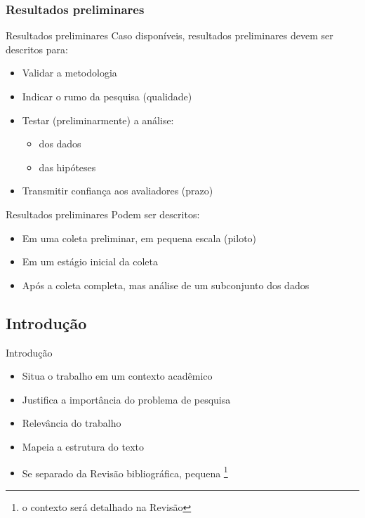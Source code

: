 \documentclass{beamer}
\begin{document}
\subsubsection{Resultados preliminares}

\begin{frame}{Resultados preliminares}
  \scriptsize
  Caso disponíveis, resultados preliminares devem ser descritos para:
  \bigskip
  \begin{itemize}
    \footnotesize
  \item Validar a metodologia
  \bigskip
  \item Indicar o rumo da pesquisa (qualidade)
  \bigskip
  \item Testar (preliminarmente) a análise:
    \begin{itemize}
      \scriptsize
    \item dos dados
    \item das hipóteses
    \end{itemize}
  \bigskip
  \item Transmitir confiança aos avaliadores (prazo)
  \end{itemize}
\end{frame}

\begin{frame}{Resultados preliminares}
  \scriptsize
  Podem ser descritos:
  \bigskip
  \begin{itemize}
    \footnotesize
  \item Em uma coleta preliminar, em pequena escala (piloto)
  \bigskip
  \item Em um estágio inicial da coleta
  \bigskip
  \item Após a coleta completa, mas análise de um subconjunto dos dados
  \end{itemize}
\end{frame}

\subsection{Introdução}

\begin{frame}{Introdução}
  \begin{itemize}
    \footnotesize
  \item Situa o trabalho em um contexto acadêmico
  \bigskip
  \item Justifica a importância do problema de pesquisa
  \bigskip
  \item Relevância do trabalho
  \bigskip
  \item Mapeia a estrutura do texto
  \bigskip
  \item Se separado da Revisão bibliográfica, pequena \footnote{o
      contexto será detalhado na Revisão}
  \end{itemize}
\end{frame}
\end{document}
